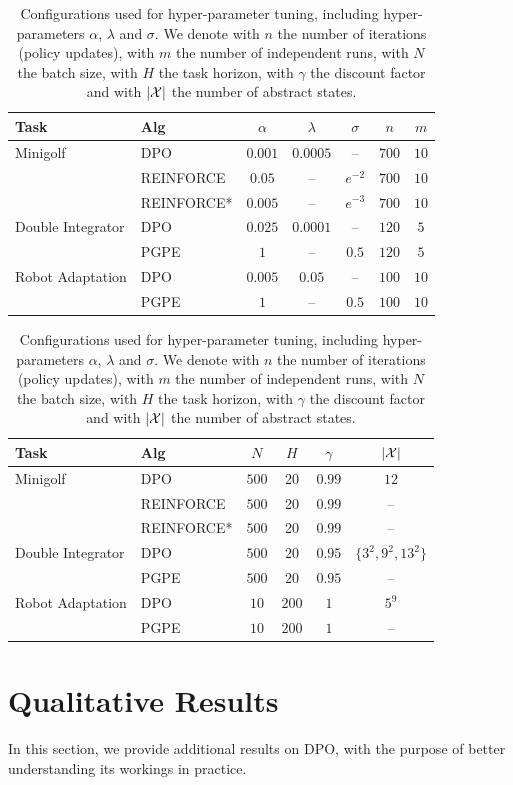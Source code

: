 \begin{table}[t]
	\begin{tabular}{ll|ccccc}
		\toprule
		\textbf{Task} & \textbf{Alg} & $\alpha$ & $\lambda$ & $\sigma$ & $n$ & $m$\\
		\midrule
		Minigolf & DPO & $0.001$ & $0.0005$ & -- & $700$ & $10$ \\
		& REINFORCE & $0.05$ & -- & $e^{-2}$ & $700$ & $10$ \\
		& REINFORCE* & $0.005$ & -- & $e^{-3}$ & $700$ & $10$ \\
		\midrule
		Double Integrator & DPO & $0.025$ & $0.0001$ & -- & $120$ & $5$ \\
		& PGPE & $1$ & -- & $0.5$ & $120$ & $5$ \\
		\midrule
		Robot Adaptation & DPO & $0.005$ & $0.05$ & -- & $100$ & $10$ \\
		& PGPE & $1$ & -- & $0.5$ & $100$ & $10$ \\
		\midrule
	\end{tabular}
	\begin{tabular}{ll|cccc}
		\toprule
		\textbf{Task} & \textbf{Alg} & $N$ & $H$ & \textbf{$\gamma$} & $|\mathcal{X}|$\\
		\midrule
		Minigolf & DPO & $500$ & 20 & $0.99$ & $12$ \\
		& REINFORCE & $500$ & 20 & $0.99$ & -- \\
		& REINFORCE* & $500$ & 20 & $0.99$ & -- \\
		\midrule
		Double Integrator & DPO & $500$ & $20$ & $0.95$ & $\{3^{2},9^{2},13^{2}\}$ \\
		& PGPE & $500$ & $20$ & $0.95$ & -- \\
		\midrule
		Robot Adaptation & DPO & $10$ & $200$ & $1$ & $5^{9}$ \\
		& PGPE & $10$ & $200$ & $1$ & --\\
		\midrule
	\end{tabular}
	\caption{\label{tab:recap2}Configurations used for hyper-parameter tuning, including hyper-parameters $\alpha$, $\lambda$ and $\sigma$. We denote with $n$ the number of iterations (policy updates), with $m$ the number of independent runs, with $N$ the batch size, with $H$ the task horizon, with $\gamma$ the discount factor and with $|\mathcal{X}|$ the number of abstract states.}
\end{table}


\section{Qualitative Results}\label{sec:exp3}
In this section, we provide additional results on \ac{DPO}, with the purpose of better understanding its workings in practice. 

